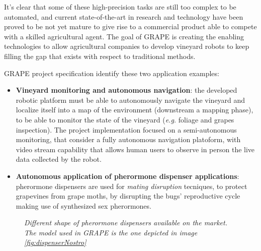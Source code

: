 It's clear that some of these high-precision tasks are still too complex to be automated, and current state-of-the-art in research and technology have been proved to be not yet mature to give rise to a commercial product able to compete with a skilled agricultural agent. The goal of \ac{GRAPE} is creating the enabling technologies to allow agricultural companies to develop vineyard robots to keep filling the gap that exists with respect to traditional methods.

\ac{GRAPE} project specification identify these two application examples:
\begin{itemize}
	\item \textbf{Vineyard monitoring and autonomous navigation}: the developed robotic platform must be able to autonomously navigate the vineyard and localize itself into a map of the environment (downstream a mapping phase), to be able to monitor the state of the vineyard (\textit{e.g.} foliage and grapes inspection). The project implementation focused on a semi-autonomous monitoring, that consider a fully autonomous navigation platoform, with video stream capability that allows human users to observe in person the live data collected by the robot. 
	\item \textbf{Autonomous application of pherormone dispenser applications}: pherormone dispensers are used for \textit{mating disruption} tecniques, to protect grapevines from grape moths, by disrupting the bugs' reproductive cycle making use of synthesized sex pherormones. 
\end{itemize}

\begin{figure}
	\centering
	\qquad
	\qquad
	\caption{\textit{Different shape of pherormone dispensers available on the market. The model used in \ac{GRAPE} is the one depicted in image \ref{fig:dispenserNostro}}}
	\label{fig:dispensers}
\end{figure}


